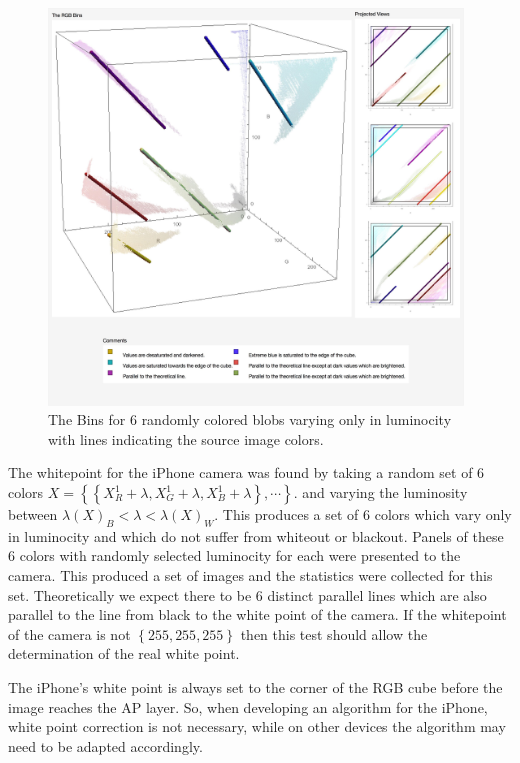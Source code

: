\begin{figure}[h!]
  \centering
    \includegraphics[width=0.98\textwidth]{Chapter3/Figs/Theory_And_Practice.jpg}
    \caption{The Bins for 6 randomly colored blobs varying only in luminocity with lines indicating the source image colors.}  \label{fig:WhitePoint}
\end{figure}

The whitepoint for the iPhone camera was found by taking a random set of 6 colors $X=\left\{ \left\{X^1_R +\lambda, X^1_G  +\lambda, X^1_B +\lambda \right\}, \cdots \right\} $. and varying the luminosity between  $ \lambda(X)_B < \lambda  < \lambda(X)_W$. This produces a set of 6 colors which vary only in luminocity and which do not suffer from whiteout or blackout. Panels of these 6 colors with randomly selected luminocity for each were presented to the camera. This produced a set of images and the statistics were collected for this set. Theoretically we expect there to be 6 distinct parallel lines which are also parallel to the line from black to the white point of the camera. If the whitepoint of the camera is not $\left\{ 255,255,255\right\}$ then this test should allow the determination of the real white point. 

The iPhone's white point is always set to the corner of the RGB cube before the image reaches the AP layer. So, when developing an algorithm for the iPhone, white point correction is not necessary, while on other devices the algorithm may need to be adapted accordingly.
